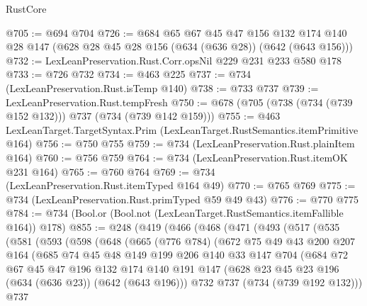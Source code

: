 \begin{lexlean}{RustCore}
\begin{coremodule}
@705 := @694 @704
@726 := @684
    @65
    @67
    @45
    @47
    @156
    @132
    @174
    @140
    @28
    @147
    (@628 @28 @45 @28 @156 (@634 (@636 @28)) (@642 (@643 @156)))
@732 := LexLeanPreservation.Rust.Corr.opsNil @229 @231 @233 @580 @178
@733 := @726 @732
@734 := @463 @225
@737 := @734 (LexLeanPreservation.Rust.isTemp @140)
@738 := @733 @737
@739 := LexLeanPreservation.Rust.tempFresh
@750 := @678 (@705 (@738 (@734 (@739 @152 @132))) @737 (@734 (@739 @142 @159)))
@755 := @463 LexLeanTarget.TargetSyntax.Prim (LexLeanTarget.RustSemantics.itemPrimitive @164)
@756 := @750 @755
@759 := @734 (LexLeanPreservation.Rust.plainItem @164)
@760 := @756 @759
@764 := @734 (LexLeanPreservation.Rust.itemOK @231 @164)
@765 := @760 @764
@769 := @734 (LexLeanPreservation.Rust.itemTyped @164 @49)
@770 := @765 @769
@775 := @734 (LexLeanPreservation.Rust.primTyped @59 @49 @43)
@776 := @770 @775
@784 := @734 (Bool.or (Bool.not (LexLeanTarget.RustSemantics.itemFallible @164)) @178)
@855 := @248
    (@419
      (@466
        (@468
          (@471
            (@493
              (@517
                (@535
                  (@581
                    (@593
                      (@598
                        (@648
                          (@665
                            (@776 @784)
                            (@672
                              @75
                              @49
                              @43
                              @200
                              @207
                              @164
                              (@685
                                @74
                                @45
                                @48
                                @149
                                @199
                                @206
                                @140
                                @33
                                @147
                                @704
                                (@684
                                  @72
                                  @67
                                  @45
                                  @47
                                  @196
                                  @132
                                  @174
                                  @140
                                  @191
                                  @147
                                  (@628 @23 @45 @23 @196 (@634 (@636 @23)) (@642 (@643 @196)))
                                  @732
                                  @737
                                  (@734 (@739 @192 @132)))
                                @737

\end{coremodule}
\end{lexlean}
